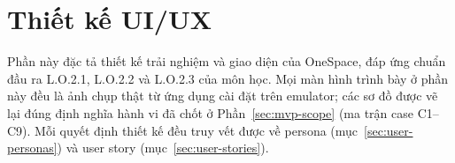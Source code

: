 \section{Thiết kế UI/UX}
\label{sec:ui-ux-design}

Phần này đặc tả thiết kế trải nghiệm và giao diện của OneSpace, đáp ứng chuẩn đầu ra L.O.2.1, L.O.2.2 và L.O.2.3 của môn học. Mọi màn hình trình bày ở phần này đều là ảnh chụp thật từ ứng dụng cài đặt trên emulator; các sơ đồ được vẽ lại đúng định nghĩa hành vi đã chốt ở Phần~\ref{sec:mvp-scope} (ma trận case C1--C9). Mỗi quyết định thiết kế đều truy vết được về persona (mục~\ref{sec:user-personas}) và user story (mục~\ref{sec:user-stories}).








